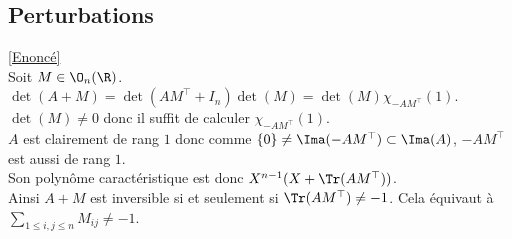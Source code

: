 \documentclass[8pt]{book}
\begin{document}
	\subsection{Perturbations }
	\label{Perturbations corrigé}
	\textcolor{blue}{\hyperref[Perturbations]{[Enoncé]}}\\
	Soit $M\in \O_n(\R)$.\\
	$\det(A+M)=\det(AM^\top+I_n)\det(M)=\det(M)\chi_{-AM^\top}(1)$. $\det(M)\ne 0$ donc il suffit de calculer $\chi_{-AM^\top}(1)$.\\
	$A$ est clairement de rang $1$ donc comme $\{0\}\ne\Ima(-AM^\top)\subset \Ima(A)$, $-AM^\top$ est aussi de rang $1$.\\
	Son polynôme caractéristique est donc $X^{n-1}(X+\Tr(AM^\top))$.\\
	Ainsi $A+M$ est inversible si et seulement si $\Tr(AM^\top)\ne -1$. Cela équivaut à $\displaystyle\sum_{1\leq i,j\leq n}M_{ij}\ne -1$.
	
\end{document}
